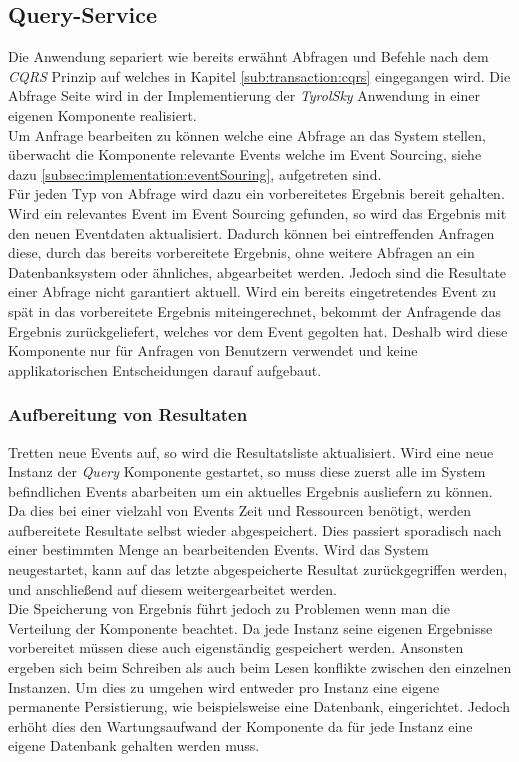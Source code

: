 \subsection{Query-Service}
Die Anwendung separiert wie bereits erwähnt Abfragen und Befehle nach dem \textit{CQRS} Prinzip auf welches in Kapitel \ref{sub:transaction:cqrs} eingegangen wird. Die Abfrage Seite wird in der Implementierung der \textit{TyrolSky} Anwendung in einer eigenen Komponente realisiert. \\
Um Anfrage bearbeiten zu können welche eine Abfrage an das System stellen, überwacht die Komponente relevante Events welche im Event Sourcing, siehe dazu \ref{subsec:implementation:eventSouring}, aufgetreten sind. \\
Für jeden Typ von Abfrage wird dazu ein vorbereitetes Ergebnis bereit gehalten. Wird ein relevantes Event im Event Sourcing gefunden, so wird das Ergebnis mit den neuen Eventdaten aktualisiert. Dadurch können bei eintreffenden Anfragen diese, durch das bereits vorbereitete Ergebnis, ohne weitere Abfragen an ein Datenbanksystem oder ähnliches, abgearbeitet werden. Jedoch sind die Resultate einer Abfrage nicht garantiert aktuell. Wird ein bereits eingetretendes Event zu spät in das vorbereitete Ergebnis miteingerechnet, bekommt der Anfragende das Ergebnis zurückgeliefert, welches vor dem Event gegolten hat. Deshalb wird diese Komponente nur für Anfragen von Benutzern verwendet und keine applikatorischen Entscheidungen darauf aufgebaut.

\subsubsection{Aufbereitung von Resultaten}
\label{subsubsub:implementation:queryActorModel:resultPreparator}
Tretten neue Events auf, so wird die Resultatsliste aktualisiert. Wird eine neue Instanz der \textit{Query} Komponente gestartet, so muss diese zuerst alle im System befindlichen Events abarbeiten um ein aktuelles Ergebnis ausliefern zu können. Da dies bei einer vielzahl von Events Zeit und Ressourcen benötigt, werden aufbereitete Resultate selbst wieder abgespeichert. Dies passiert sporadisch nach einer bestimmten Menge an bearbeitenden Events. Wird das System neugestartet, kann auf das letzte abgespeicherte Resultat zurückgegriffen werden, und anschließend auf diesem weitergearbeitet werden. \\
Die Speicherung von Ergebnis führt jedoch zu Problemen wenn man die Verteilung der Komponente beachtet. Da jede Instanz seine eigenen Ergebnisse vorbereitet müssen diese auch eigenständig gespeichert werden. Ansonsten ergeben sich beim Schreiben als auch beim Lesen konflikte zwischen den einzelnen Instanzen. Um dies zu umgehen wird entweder pro Instanz eine eigene permanente Persistierung, wie beispielsweise eine Datenbank, eingerichtet. Jedoch erhöht dies den Wartungsaufwand der Komponente da für jede Instanz eine eigene Datenbank gehalten werden muss. \\


